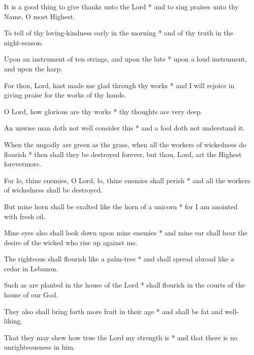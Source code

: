 It is a good thing to give thanks unto the Lord * and to sing praises unto thy Name, O most Highest.

To tell of thy loving-kindness early in the morning * and of thy truth in the night-season.

Upon an instrument of ten strings, and upon the lute * upon a loud instrument, and upon the harp.

For thou, Lord, hast made me glad through thy works * and I will rejoice in giving praise for the works of thy hands.

O Lord, how glorious are thy works * thy thoughts are very deep.

An unwise man doth not well consider this * and a fool doth not understand it.

When the ungodly are green as the grass, when all the workers of wickedness do flourish * then shall they be destroyed forever, but thou, Lord, art the Highest forevermore.

For lo, thine enemies, O Lord, lo, thine enemies shall perish * and all the workers of wickedness shall be destroyed.

But mine horn shall be exalted like the horn of a unicorn * for I am anointed with fresh oil.

Mine eyes also shall look down upon mine enemies * and mine ear shall hear the desire of the wicked who rise up against me.

The righteous shall flourish like a palm-tree * and shall spread abroad like a cedar in Lebanon.

Such as are planted in the house of the Lord * shall flourish in the courts of the house of our God.

They also shall bring forth more fruit in their age * and shall be fat and well-liking.

That they may shew how true the Lord my strength is * and that there is no unrighteousness in him.